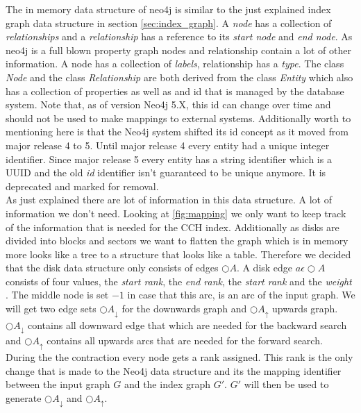 The in memory data structure of neo4j is similar to the just explained index graph data structure in section \ref{sec:index_graph}. A \textit{node} has a collection of \textit{relationships} and a \textit{relationship} has a reference to its \textit{start node} and \textit{end node}.
As neo4j is a full blown property graph nodes and relationship contain a lot of other information. A node has a collection of \textit{labels}, relationship has a \textit{type}. The class \textit{Node} and the class \textit{Relationship} 
are both derived from the class \textit{Entity} which also has a collection of properties as well as and id that is managed by the database system. Note that, as of version Neo4j 5.X, this id can change over time and should not be used to make mappings to external systems. Additionally 
worth to mentioning here is that the Neo4j system shifted its id concept as it moved from major release 4 to 5. Until major release 4 every entity had a unique integer identifier. Since major release 5 every entity has a string identifier which is a UUID and the old \textit{id} identifier
isn't guaranteed to be unique anymore. It is deprecated and marked for removal.
\\
As just explained there are lot of information in this data structure. A lot of information we don't need. Looking at \ref{fig:mapping} we only want to keep track of the information that is needed for the CCH index. Additionally as disks are
divided  into blocks and sectors we want to flatten the graph which is in memory more looks like a tree to a structure that looks like a table. Therefore we decided that the disk data structure only consists of edges $\bigcirc A$. A disk edge $a \epsilon \bigcirc A$ consists of four values, 
the \textit{start rank}, the \textit{end rank}, the \textit{start rank} and the \textit{weight} . The middle node is set $-1$ in case that this arc, is an arc of the input graph. We will get two edge sets $\bigcirc A_\downarrow$ for the downwards graph and $\bigcirc A_\uparrow $ upwards graph.
$\bigcirc A_\downarrow$ contains all downward edge that which are needed for the backward search and $\bigcirc A_\uparrow$ contains all upwards arcs that are needed for the forward search.
\\
During the the contraction every node gets a rank assigned. This rank is the only change that is made to the Neo4j data structure and its the mapping identifier between the input graph $G$ and the index graph $G'$. $G'$ will then be used to generate $\bigcirc A_\downarrow$ and $\bigcirc A_\uparrow$.




